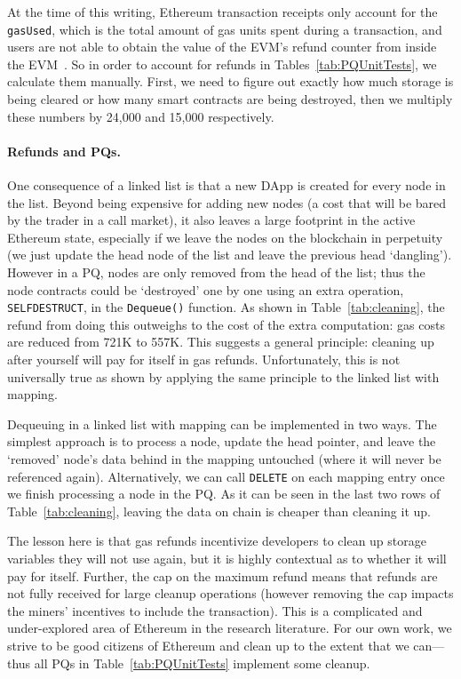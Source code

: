 At the time of this writing, Ethereum transaction receipts only account for the \texttt{gasUsed}, which is the total amount of gas units spent during a transaction, and users are not able to obtain the value of the EVM's refund counter from inside the EVM~\cite{signer2018gas}. So in order to account for refunds in Tables~\ref{tab:PQUnitTests}, we calculate them manually. First, we need to figure out exactly how much storage is being cleared or how many smart contracts are being destroyed, then we multiply these numbers by 24,000 and 15,000 respectively. 

\paragraph{Refunds and PQs.}

One consequence of a linked list is that a new DApp is created for every node in the list. Beyond being expensive for adding new nodes (a cost that will be bared by the trader in a call market), it also leaves a large footprint in the active Ethereum state, especially if we leave the nodes on the blockchain in perpetuity (\ie we just update the head node of the list and leave the previous head `dangling'). However in a PQ, nodes are only removed from the head of the list; thus the node contracts could be `destroyed' one by one using an extra operation, \texttt{SELFDESTRUCT}, in the \texttt{Dequeue()} function. As shown in Table~\ref{tab:cleaning}, the refund from doing this outweighs to the cost of the extra computation: gas costs are reduced from 721K to 557K.  This suggests a general principle: cleaning up after yourself will pay for itself in gas refunds. Unfortunately, this is not universally true as shown by applying the same principle to the linked list with mapping. 

Dequeuing in a linked list with mapping can be implemented in two ways. The simplest approach is to process a node, update the head pointer, and leave the `removed' node's data behind in the mapping untouched (where it will never be referenced again). Alternatively, we can call \texttt{DELETE} on each mapping entry once we finish processing a node in the PQ. As it can be seen in the last two rows of Table~\ref{tab:cleaning}, leaving the data on chain is cheaper than cleaning it up.

The lesson here is that gas refunds incentivize developers to clean up storage variables they will not use again, but it is highly contextual as to whether it will pay for itself. Further, the cap on the maximum refund means that refunds are not fully received for large cleanup operations (however removing the cap impacts the miners' incentives to include the transaction). This is a complicated and under-explored area of Ethereum in the research literature. For our own work, we strive to be good citizens of Ethereum and clean up to the extent that we can---thus all PQs in Table~\ref{tab:PQUnitTests} implement some cleanup.


